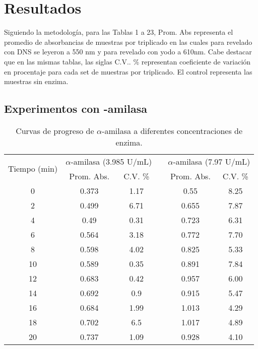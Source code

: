 \documentclass{article}
\begin{document}
	
\section{Resultados}

Siguiendo la metodología, para las Tablas 1 a 23,  Prom. Abs  representa el promedio de absorbancias de muestras por triplicado en las cuales para revelado con DNS se leyeron a 550 nm y para revelado con   yodo a 610nm. Cabe destacar que en las mismas tablas, las siglas C.V.. \% representan coeficiente de variación  en procentaje para cada set de muestras por triplicado. El control representa las muestras sin enzima.

\subsection{ Experimentos con \bm{$\alpha$}-amilasa}

\begin{table}[H]
  \centering
  \caption{Curvas de progreso de $\alpha$-amilasa a diferentes concentraciones de enzima. }
    \begin{tabular}{cccccc}
    \toprule
    \multirow{2}[4]{*}{Tiempo (min)} & \multicolumn{2}{c}{$\alpha$-amilasa (3.985 U/mL)} &       & \multicolumn{2}{c}{$\alpha$-amilasa (7.97 U/mL)} \\
\cmidrule{2-3}\cmidrule{5-6}          & Prom. Abs.  & C.V. \% &       & Prom. Abs. & C.V. \% \\
\cmidrule{1-6}    0     & 0.373 & 1.17  &       & 0.55  & 8.25 \\
    2     & 0.499 & 6.71  &       & 0.655 & 7.87 \\
    4     & 0.49  & 0.31  &       & 0.723 & 6.31 \\
    6     & 0.564 & 3.18  &       & 0.772 & 7.70 \\
    8     & 0.598 & 4.02  &       & 0.825 & 5.33 \\
    10    & 0.589 & 0.35  &       & 0.891 & 7.84 \\
    12    & 0.683 & 0.42  &       & 0.957 & 6.00 \\
    14    & 0.692 & 0.9   &       & 0.915 & 5.47 \\
    16    & 0.684 & 1.99  &       & 1.013 & 4.29 \\
    18    & 0.702 & 6.5   &       & 1.017 & 4.89 \\
    20    & 0.737 & 1.09  &       & 0.928 & 4.10 \\
    \bottomrule
    \end{tabular}%
  \label{tab:a1}%
\end{table}%
\end{document}
